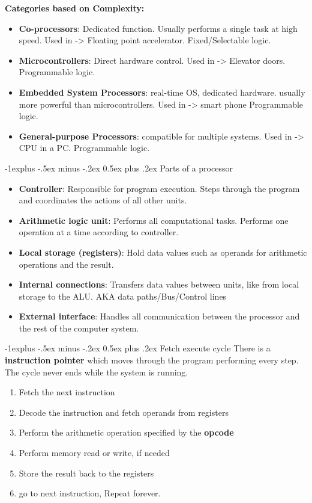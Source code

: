 \documentclass[letterpaper, 8pt]{extarticle}
\makeatletter
\renewcommand{\subsection}{\@startsection{subsection}{2}{0mm}%
                                {-1explus -.5ex minus -.2ex}%
                                {0.5ex plus .2ex}%
                                {\normalfont\small\bfseries}}
\makeatother
\begin{document}
\begin{multicols*}{6}
	\textbf{Categories based on Complexity:} \\
	\begin{itemize}
		\item \textbf{Co-processors}: Dedicated function. Usually performs a single task at high speed. Used in -> Floating point accelerator. Fixed/Selectable logic.
		\item \textbf{Microcontrollers}: Direct hardware control. Used in -> Elevator doors. Programmable logic.
		\item \textbf{Embedded System Processors}: real-time OS, dedicated hardware. usually more powerful than microcontrollers. Used in -> smart phone Programmable logic.
		\item \textbf{General-purpose Processors}: compatible for multiple systems. Used in -> CPU in a PC. Programmable logic.
	\end{itemize}

	\subsection{Parts of a processor}
	\begin{itemize}
		\item \textbf{Controller}: Responsible for program execution. Steps through the program and coordinates the actions of all other units.
		\item \textbf{Arithmetic logic unit}: Performs all computational tasks. Performs one operation at a time according to controller.
		\item \textbf{Local storage (registers)}: Hold data values such as operands for arithmetic operations and the result.
		\item \textbf{Internal connections}: Transfers data values between units, like from local storage to the ALU. AKA data paths/Bus/Control lines
		\item \textbf{External interface}: Handles all communication between the processor and the rest of the computer system.
	\end{itemize}

	\subsection{Fetch execute cycle}
	There is a \textbf{instruction pointer} which moves through the program performing every step. The cycle never ends while the system is running.
	\begin{enumerate}
		\item Fetch the next instruction
		\item Decode the instruction and fetch operands from registers
		\item Perform the arithmetic operation specified by the \textbf{opcode}
		\item Perform memory read or write, if needed
		\item Store the result back to the registers
		\item go to next instruction, Repeat forever.
	\end{enumerate}


\end{multicols*}
\end{document}
